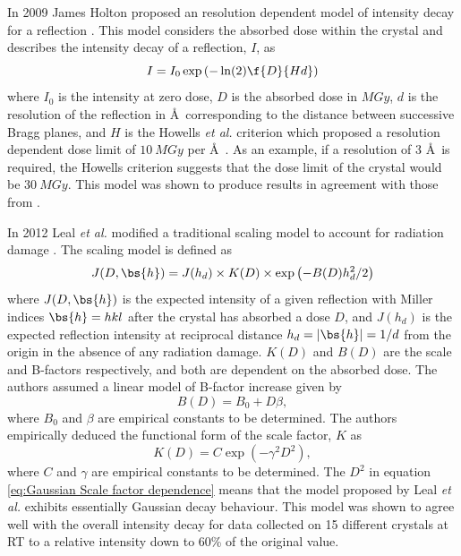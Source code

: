         In 2009 James Holton proposed an resolution dependent model of intensity decay for a reflection \cite{holton2009}. This model considers the absorbed dose within the crystal and describes the intensity decay of a reflection, $I$, as
        \begin{equation}
            I = I_0 \exp \left(-\ln(2)\f{D}{Hd}\right)
        \end{equation}
        where $I_0$ is the intensity at zero dose, $D$ is the absorbed dose in $MGy$, $d$ is the resolution of the reflection in \AA\ corresponding to the distance between successive Bragg planes, and $H$ is the Howells \textit{et al.} criterion which proposed a resolution dependent dose limit of $10\ MGy$ per \AA\ \cite{howells2009}. As an example, if a resolution of 3 \AA\ is required, the Howells criterion suggests that the dose limit of the crystal would be 30$\ MGy$.
		This model was shown to produce results in agreement with those from \cite{owen2006,kmetko2006}.

        In 2012 Leal \textit{et al.} modified a traditional scaling model to account for radiation damage \cite{leal2012}. The scaling model is defined as
        \begin{equation}
            J(D,\bs{h}) = J(h_d) \times K(D) \times \exp\left( -B(D) h_d^2/2\right)
			\label{eq:Scaling Model Leal 2012}
        \end{equation}
        where $J(D,\bs{h})$ is the expected intensity of a given reflection with Miller indices $\bs{h} = hkl$ after the crystal has absorbed a dose $D$, and $J(h_d)$ is the expected reflection intensity at reciprocal distance $h_d = |\bs{h}| = 1/d$ from the origin in the absence of any radiation damage.
		$K(D)$ and $B(D)$ are the scale and B-factors respectively, and both are dependent on the absorbed dose.
		The authors assumed a linear model of B-factor increase given by
		\begin{equation}
			B(D) = B_0 + D \beta,
            \label{eq:Linear B factor dependence}
		\end{equation}
		where $B_0$ and $\beta$ are empirical constants to be determined.
		The authors empirically deduced the functional form of the scale factor, $K$ as
		\begin{equation}
			K(D) = C \exp\left(-\gamma^2 D^2\right),
            \label{eq:Gaussian Scale factor dependence}
		\end{equation}
		where $C$ and $\gamma$ are empirical constants to be determined.
        The $D^2$ in equation \ref{eq:Gaussian Scale factor dependence} means that the model proposed by Leal \textit{et al.} exhibits essentially Gaussian decay behaviour.
		This model was shown to agree well with the overall intensity decay for data collected on 15 different crystals at RT to a relative intensity down to 60\% of the original value.

